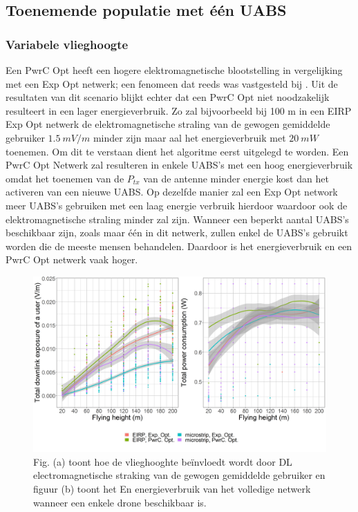 \documentclass[twocolumn]{phdsymp_dutch}
\begin{document}
\subsection{Toenemende populatie met \'e\'en UABS}
\subsubsection{Variabele vlieghoogte}
Een \gls{PwrC Opt} heeft een hogere elektromagnetische blootstelling in vergelijking met een
 \gls{Exp Opt} netwerk; een fenomeen dat reeds was vastgesteld bij \cite{J1}. 
Uit de resultaten van dit scenario blijkt echter dat een
\gls{PwrC Opt} niet noodzakelijk resulteert in een lager energieverbruik.
Zo zal bijvoorbeeld bij 100 m in een  \gls{EIRP} \gls{Exp Opt} netwerk
 de elektromagnetische straling van de gewogen gemiddelde gebruiker
 $1.5\ mV/m$ minder zijn maar aal het energieverbruik met $20\ mW$ toenemen.
Om dit te verstaan dient het algoritme eerst uitgelegd te worden.
Een  \gls{PwrC Opt} Netwerk zal resulteren in enkele \gls{UABS}'s met een hoog energieverbruik 
omdat het toenemen van de $P_{tx}$ van de antenne minder energie kost dan het activeren van een nieuwe \gls{UABS}.
Op dezelfde manier zal een \gls{Exp Opt} network meer \gls{UABS}'s gebruiken met een laag energie verbruik hierdoor waardoor ook de elektromagnetische straling minder zal zijn.
Wanneer een beperkt aantal \gls{UABS}'s beschikbaar zijn, zoals maar \'e\'en in dit netwerk, 
zullen enkel de \gls{UABS}'s gebruikt worden die de meeste mensen behandelen.
Daardoor is het energieverbruik en een \gls{PwrC Opt} netwerk vaak hoger.


\begin{figure}[h!]
  \includegraphics[width=\linewidth]{s2/fhvsdlAndPc.png}
  \caption{Fig. (a) toont hoe de vlieghooghte be\"invloedt wordt door \acs{DL} electromagnetische straking van de 
  gewogen gemiddelde gebruiker en figuur (b) toont het En energieverbruik van het volledige netwerk wanneer een enkele drone beschikbaar is.}
  \label{fig:s2a_dlAndPc}
\end{figure}
\end{document}
